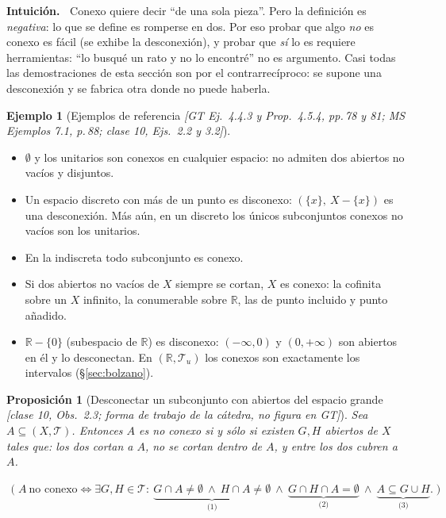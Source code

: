 \documentclass[11pt,a4paper]{article}
\newenvironment{intuicion}{\begin{cajaint}\small\textbf{Intuición.\ }}{\end{cajaint}}
\newenvironment{lista}{\leavevmode\begin{itemize}[leftmargin=1.5em,itemsep=1pt,topsep=2pt,parsep=0pt]}{\end{itemize}}
\newcommand{\lgc}[1]{\par\vspace{-3pt}\begin{gather*}\big(\;#1\;\big)\end{gather*}\vspace{-6pt}}
\theoremstyle{definition}
\newtheorem{ejemplo}[definicion]{Ejemplo}
\theoremstyle{plain}
\newtheorem{proposicion}[definicion]{Proposición}
\newcommand{\fnt}[1]{{\normalfont\small\itshape\color{gray!150!black}[#1]}}
\newcommand{\R}{\mathbb{R}}
\newcommand{\tp}{\mathcal{T}}
\begin{document}
\begin{intuicion}
Conexo quiere decir ``de una sola pieza''. Pero la definición es \emph{negativa}: lo que se define es romperse en dos. Por eso probar que algo \emph{no} es conexo es fácil (se exhibe la desconexión), y probar que \emph{sí} lo es requiere herramientas: ``lo busqué un rato y no lo encontré'' no es argumento. Casi todas las demostraciones de esta sección son por el contrarrecíproco: se supone una desconexión y se fabrica otra donde no puede haberla.
\end{intuicion}

\begin{ejemplo}[Ejemplos de referencia \fnt{GT Ej.\ 4.4.3 y Prop.\ 4.5.4, pp.\,78 y 81; MS Ejemplos 7.1, p.\,88; clase 10, Ejs.\ 2.2 y 3.2}]\label{ej:conex}
\begin{lista}
\item $\emptyset$ y los unitarios son conexos en cualquier espacio: no admiten dos abiertos no vacíos y disjuntos.
\item Un espacio discreto con más de un punto es disconexo: $(\{x\},\ X-\{x\})$ es una desconexión. Más aún, en un discreto los únicos subconjuntos conexos no vacíos son los unitarios.
\item En la indiscreta todo subconjunto es conexo.
\item Si dos abiertos no vacíos de $X$ siempre se cortan, $X$ es conexo: la cofinita sobre un $X$ infinito, la conumerable sobre $\R$, las de punto incluido y punto añadido.
\item $\R-\{0\}$ (subespacio de $\R$) es disconexo: $(-\infty,0)$ y $(0,+\infty)$ son abiertos en él y lo desconectan. En $(\R,\tp_u)$ los conexos son exactamente los intervalos (\S\ref{sec:bolzano}).
\end{lista}
\end{ejemplo}

\begin{proposicion}[Desconectar un subconjunto con abiertos del espacio grande \fnt{clase 10, Obs.\ 2.3; forma de trabajo de la cátedra, no figura en GT}]\label{pr:GH}
Sea $A\subseteq(X,\tp)$. Entonces $A$ es no conexo si y sólo si existen $G,H$ abiertos \emph{de $X$} tales que: los dos cortan a $A$, no se cortan \emph{dentro de $A$}, y entre los dos cubren a $A$.
\lgc{A\ \text{no conexo}\iff \exists G,H\in\tp:\ \underbrace{G\cap A\ne\emptyset\ \wedge\ H\cap A\ne\emptyset}_{\text{(1)}}\ \wedge\ \underbrace{G\cap H\cap A=\emptyset}_{\text{(2)}}\ \wedge\ \underbrace{A\subseteq G\cup H}_{\text{(3)}}.}
\end{proposicion}
\end{document}

